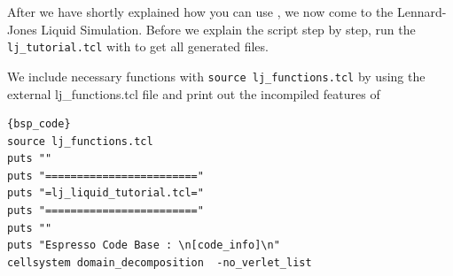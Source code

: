 \documentclass[
paper=a4,                       %
fontsize=11pt,                  %
twoside,                        %
footsepline,                    %
headsepline,                    %
headinclude=false,              %
footinclude=false,              %
pagesize,                       %
]{scrartcl}
\begin{document}
   
After we have shortly explained how you can use \es{}, we now come to the Lennard-Jones Liquid Simulation. 
Before we explain the script step by step, run the \texttt{lj\_tutorial.tcl}  with \es{} to get all generated files.
   

We include necessary functions with  \lstinline|source lj_functions.tcl| by using the external lj\_functions.tcl file and print out the incompiled features of \es
{\small\vspace{0,2cm}
\begin{lstlisting}{bsp_code}
source lj_functions.tcl
puts ""
puts "========================"
puts "=lj_liquid_tutorial.tcl="
puts "========================"
puts ""
puts "Espresso Code Base : \n[code_info]\n"
cellsystem domain_decomposition  -no_verlet_list
\end{lstlisting}}\vspace{0,2cm}
\end{document}
